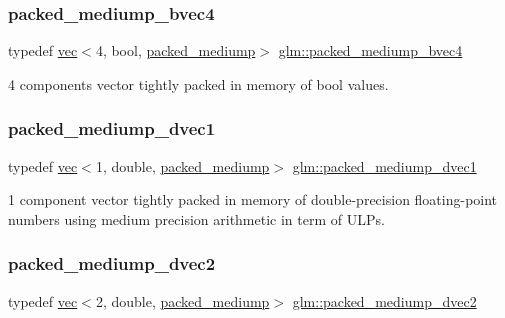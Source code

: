 \subsubsection{\texorpdfstring{packed\+\_\+mediump\+\_\+bvec4}{packed\_mediump\_bvec4}}
{\footnotesize\ttfamily typedef \mbox{\hyperlink{structglm_1_1vec}{vec}}$<$4, bool, \mbox{\hyperlink{namespaceglm_a36ed105b07c7746804d7fdc7cc90ff25a9604654c3b137cd7898689fd34b25bc0}{packed\+\_\+mediump}}$>$ \mbox{\hyperlink{group__gtc__type__aligned_gad50db2a2ae76ec64785b9d87cd2dfb2c}{glm\+::packed\+\_\+mediump\+\_\+bvec4}}}



4 components vector tightly packed in memory of bool values. 

\mbox{\label{group__gtc__type__aligned_gaf34b2d86391c45507ccc7c605992b8d3}} 
\subsubsection{\texorpdfstring{packed\+\_\+mediump\+\_\+dvec1}{packed\_mediump\_dvec1}}
{\footnotesize\ttfamily typedef \mbox{\hyperlink{structglm_1_1vec}{vec}}$<$1, double, \mbox{\hyperlink{namespaceglm_a36ed105b07c7746804d7fdc7cc90ff25a9604654c3b137cd7898689fd34b25bc0}{packed\+\_\+mediump}}$>$ \mbox{\hyperlink{group__gtc__type__aligned_gaf34b2d86391c45507ccc7c605992b8d3}{glm\+::packed\+\_\+mediump\+\_\+dvec1}}}



1 component vector tightly packed in memory of double-\/precision floating-\/point numbers using medium precision arithmetic in term of U\+L\+Ps. 

\mbox{\label{group__gtc__type__aligned_ga5cbf23f43f82491a631c35ca8664ae0b}} 
\subsubsection{\texorpdfstring{packed\+\_\+mediump\+\_\+dvec2}{packed\_mediump\_dvec2}}
{\footnotesize\ttfamily typedef \mbox{\hyperlink{structglm_1_1vec}{vec}}$<$2, double, \mbox{\hyperlink{namespaceglm_a36ed105b07c7746804d7fdc7cc90ff25a9604654c3b137cd7898689fd34b25bc0}{packed\+\_\+mediump}}$>$ \mbox{\hyperlink{group__gtc__type__aligned_ga5cbf23f43f82491a631c35ca8664ae0b}{glm\+::packed\+\_\+mediump\+\_\+dvec2}}}



